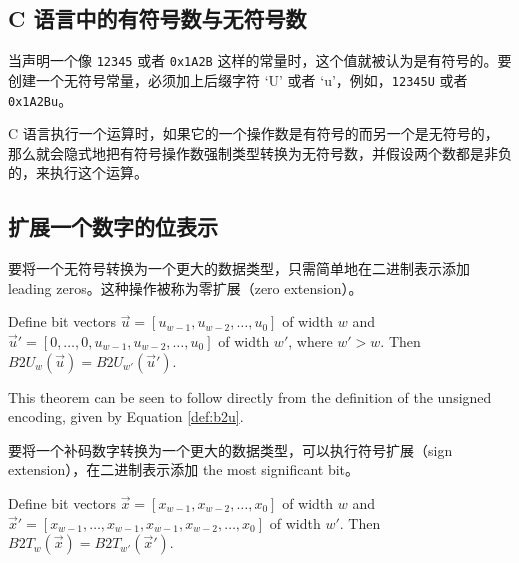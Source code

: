 \subsection{C 语言中的有符号数与无符号数}

当声明一个像 \verb|12345| 或者 \verb|0x1A2B| 这样的常量时，这个值就被认为是有符号的。要创建一个无符号常量，必须加上后缀字符 ‘U’ 或者 ‘u’，例如，\verb|12345U| 或者 \verb|0x1A2Bu|。

C 语言执行一个运算时，如果它的一个操作数是有符号的而另一个是无符号的，那么就会隐式地把有符号操作数强制类型转换为无符号数，并假设两个数都是非负的，来执行这个运算。

\subsection{扩展一个数字的位表示}

要将一个无符号转换为一个更大的数据类型，只需简单地在二进制表示添加 leading zeros。这种操作被称为零扩展（zero extension）。

\begin{theorem}
    Define bit vectors $\vec{u} = [u_{w-1}, u_{w-2}, \dots, u_0]$ of width $w$ and $\vec{u}' = [0, \dots, 0, u_{w-1}, u_{w-2}, \dots, u_0]$ of width $w'$, where $w' > w$. Then $B2U_w(\vec{u}) = B2U_{w'}(\vec{u}')$.
\end{theorem}

This theorem can be seen to follow directly from the definition of the unsigned encoding, given by Equation \eqref{def:b2u}.

要将一个补码数字转换为一个更大的数据类型，可以执行符号扩展（sign extension），在二进制表示添加 the most significant bit。

\begin{theorem}
    Define bit vectors $\vec{x} = [x_{w-1}, x_{w-2}, \dots, x_0]$ of width $w$ and $\vec{x}' = [x_{w-1}, \dots, x_{w-1}, x_{w-1}, x_{w-2}, \dots, x_0]$ of width $w'$. Then $B2T_w(\vec{x}) = B2T_{w'}(\vec{x}')$.
\end{theorem}


